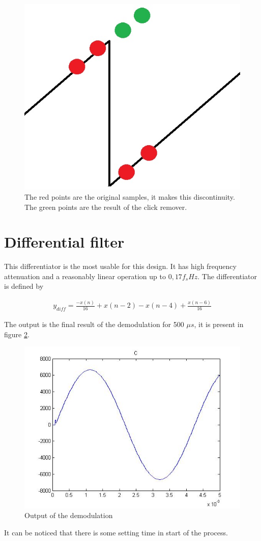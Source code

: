 \begin{figure}[h]
 \centering
 \includegraphics[scale=0.4]{images/remove.jpg}
 \caption{The red points are the original samples, it makes this discontinuity. The green points are the result of the click remover.}
 \label{fig:remove}
\end{figure}

\section{Differential filter}
This differentiator is the most usable for this design. It has high frequency attenuation and a reasonably linear operation up to $0,17f_s Hz$. The differentiator is defined by

\begin{align}
	y_{diff} = \frac{-x(n)}{16} + x(n-2) - x(n-4) + \frac{x(n-6)}{16}
\end{align}

The output is the final result of the demodulation for 500 $\mu s$, it is present in figure \ref{fig:pure}.

\begin{figure}[h]
 \centering
 \includegraphics[scale=0.4]{images/ypure.jpg}
 \caption{Output of the demodulation}
 \label{fig:pure}
\end{figure}

It can be noticed that there is some setting time in start of the process.